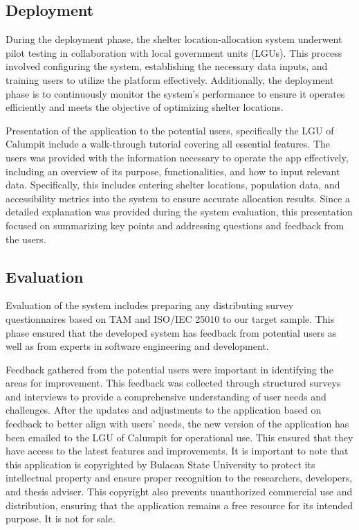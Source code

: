 \subsection{Deployment}
	During the deployment phase, the shelter location-allocation system underwent pilot testing in collaboration with local government units (LGUs). This process involved configuring the system, establishing the necessary data inputs, and training users to utilize the platform effectively. Additionally, the deployment phase is to continuously monitor the system's performance to ensure it operates efficiently and meets the objective of optimizing shelter locations. 

	Presentation of the application to the potential users, specifically the LGU of Calumpit include a walk-through tutorial covering all essential features. The users was provided with the information necessary to operate the app effectively, including an overview of its purpose, functionalities, and how to input relevant data. Specifically, this includes entering shelter locations, population data, and accessibility metrics into the system to ensure accurate allocation results. Since a detailed explanation was provided during the system evaluation, this presentation focused on summarizing key points and addressing questions and feedback from the users.
	
\subsection{Evaluation}
	Evaluation of the system includes preparing any distributing survey questionnaires based on TAM and ISO/IEC 25010 to our target sample. This phase ensured that the developed system has feedback from potential users as well as from experts in software engineering and development.
	
	Feedback gathered from the potential users were important in identifying the areas for improvement. This feedback was collected through structured surveys and interviews to provide a comprehensive understanding of user needs and challenges. After the updates and adjustments to the application based on feedback to better align with users’ needs, the new version of the application has been emailed to the LGU of Calumpit for operational use. This ensured that they have access to the latest features and improvements. It is important to note that this application is copyrighted by Bulacan State University to protect its intellectual property and ensure proper recognition to the researchers, developers, and thesis adviser. This copyright also prevents unauthorized commercial use and distribution, ensuring that the application remains a free resource for its intended purpose. It is not for sale.

